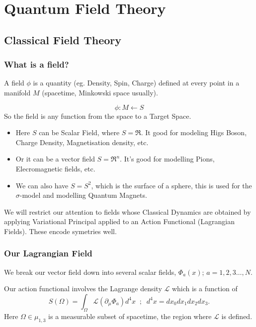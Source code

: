 \chapter{Quantum Field Theory}



\section{Classical Field Theory}


\subsection{What is a field?}

A field $\phi$ is a quantity (eg. Density, Spin, Charge) defined at every point in a manifold $M$ (spacetime, Minkowski space usually).

\begin{equation*}
  \phi : M \leftarrow S
\end{equation*}
So the field is any function from the space to a Target Space.
\begin{itemize}
  \item Here $S$ can be Scalar Field, where $S = \Re$. It good for modeling Higs Boson, Charge Density, Magnetisation density, etc.
  \item Or it can be a vector field $S = \Re^n$. It's good for modelling Pions, Elecromagnetic fields, etc.
  \item We can also have $S = S^2$, which is the surface of a sphere, this is used for the $\sigma$-model and modelling Quantum Magnets.
\end{itemize}

We will restrict our attention to fields whose Classical Dynamics are obtained by applying Variational Principal applied to an Action Functional (Lagrangian Fields). These encode symetries well.


\subsection{Our Lagrangian Field}

We break our vector field down into several scalar fields, $\Phi_a(x)$; $a = 1,2,3\dots,N$.

Our action functional involves the Lagrange density $\mathcal{L}$ which is a function of 
\begin{equation*}
  S(\Omega) = \int_\Omega \mathcal{L}(\partial_\mu \Phi_a) d^4x\;\;;\;\; d^4x = dx_0 dx_1 dx_2 dx_3.
\end{equation*}
Here $\Omega \in \mu_{1,3}$ is a measurable subset of spacetime, the region where $\mathcal{L}$ is defined.

